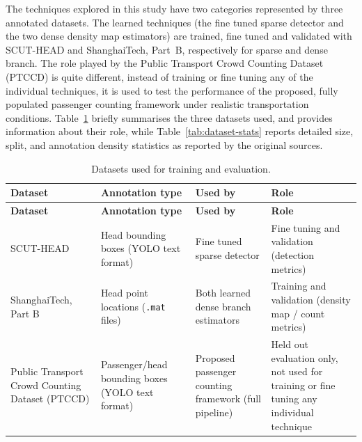 \documentclass[12pt,a4paper]{report}
\begin{document}
The techniques explored in this study have two categories represented by three annotated datasets. The learned techniques (the fine tuned sparse detector and the two dense density map estimators) are trained, fine tuned and validated with SCUT-HEAD and ShanghaiTech, Part~B, respectively for sparse and dense branch. The role played by the Public Transport Crowd Counting Dataset (PTCCD) is quite different, instead of training or fine tuning any of the individual techniques, it is used to test the performance of the proposed, fully populated passenger counting framework under realistic transportation conditions. Table~\ref{tab:datasets} briefly summarises the three datasets used, and provides information about their role, while Table~\ref{tab:dataset-stats} reports detailed size, split, and annotation density statistics as reported by the original sources.

\begin{longtable}{|
    >{\raggedright\arraybackslash}p{}|
    >{\raggedright\arraybackslash}p{}|
    >{\raggedright\arraybackslash}p{}|
    >{\raggedright\arraybackslash}p{}|
}
\caption{Datasets used for training and evaluation.}
\label{tab:datasets}\\
\hline
\textbf{Dataset} &
\textbf{Annotation type} &
\textbf{Used by} &
\textbf{Role} \\
\hline
\endfirsthead

\hline
\textbf{Dataset} &
\textbf{Annotation type} &
\textbf{Used by} &
\textbf{Role} \\
\hline
\endhead

\hline
\endfoot

\hline
\endlastfoot

SCUT-HEAD~\cite{peng2018scuthead} &
Head bounding boxes (YOLO text format) &
Fine tuned sparse detector &
Fine tuning and validation (detection metrics) \\
\hline

ShanghaiTech, Part B~\cite{Zhu2020} &
Head point locations (\texttt{.mat} files) &
Both learned dense branch estimators &
Training and validation (density map / count metrics) \\
\hline

Public Transport Crowd Counting Dataset (PTCCD) &
Passenger/head bounding boxes (YOLO text format) &
Proposed passenger counting framework (full pipeline) &
Held out evaluation only, not used for training or fine tuning any individual technique \\
\hline

\end{longtable}
\end{document}
